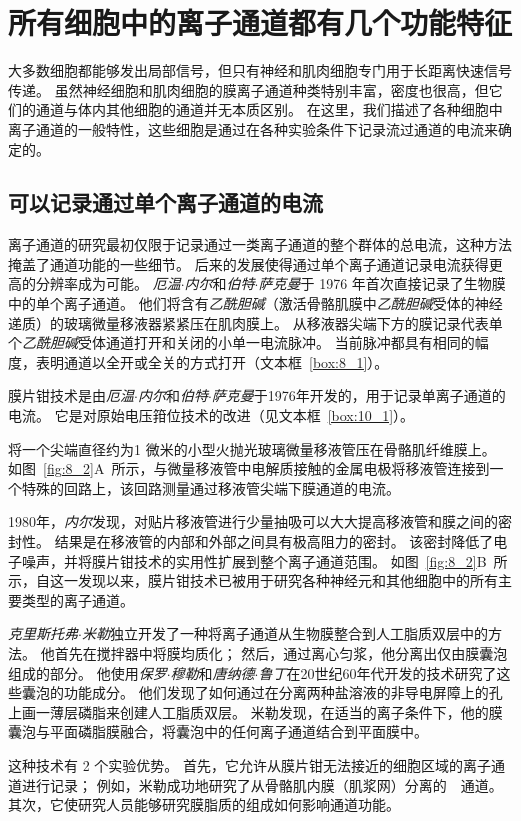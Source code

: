 \section{所有细胞中的离子通道都有几个功能特征}

大多数细胞都能够发出局部信号，但只有神经和肌肉细胞专门用于长距离快速信号传递。
虽然神经细胞和肌肉细胞的膜离子通道种类特别丰富，密度也很高，但它们的通道与体内其他细胞的通道并无本质区别。
在这里，我们描述了各种细胞中离子通道的一般特性，这些细胞是通过在各种实验条件下记录流过通道的电流来确定的。



\subsection{可以记录通过单个离子通道的电流}

离子通道的研究最初仅限于记录通过一类离子通道的整个群体的总电流，这种方法掩盖了通道功能的一些细节。
后来的发展使得通过单个离子通道记录电流获得更高的分辨率成为可能。
\textit{厄温$\cdot$内尔}和\textit{伯特$\cdot$萨克曼}于 1976 年首次直接记录了生物膜中的单个离子通道。
他们将含有\textit{乙酰胆碱}（激活骨骼肌膜中\textit{乙酰胆碱}受体的神经递质）的玻璃微量移液器紧紧压在肌肉膜上。
从移液器尖端下方的膜记录代表单个\textit{乙酰胆碱}受体通道打开和关闭的小单一电流脉冲。
当前脉冲都具有相同的幅度，表明通道以全开或全关的方式打开（文本框~\ref{box:8_1}）。


\begin{proposition} \label{box:8_1}
	
	\quad \quad 膜片钳技术是由\textit{厄温$\cdot$内尔}和\textit{伯特$\cdot$萨克曼}于1976年开发的，用于记录单离子通道的电流。
	它是对原始电压箝位技术的改进（见文本框~\ref{box:10_1}）。
	
	\quad \quad 将一个尖端直径约为1 微米的小型火抛光玻璃微量移液管压在骨骼肌纤维膜上。
	如图~\ref{fig:8_2}A~所示，与微量移液管中电解质接触的金属电极将移液管连接到一个特殊的回路上，该回路测量通过移液管尖端下膜通道的电流。
	
	\quad \quad 1980年，\textit{内尔}发现，对贴片移液管进行少量抽吸可以大大提高移液管和膜之间的密封性。
	结果是在移液管的内部和外部之间具有极高阻力的密封。
	该密封降低了电子噪声，并将膜片钳技术的实用性扩展到整个离子通道范围。
	如图~\ref{fig:8_2}B~所示，自这一发现以来，膜片钳技术已被用于研究各种神经元和其他细胞中的所有主要类型的离子通道。
	
	\quad \quad \textit{克里斯托弗$\cdot$米勒}独立开发了一种将离子通道从生物膜整合到人工脂质双层中的方法。
	他首先在搅拌器中将膜均质化；
	然后，通过离心匀浆，他分离出仅由膜囊泡组成的部分。
	他使用\textit{保罗$\cdot$穆勒}和\textit{唐纳德$\cdot$鲁丁}在20世纪60年代开发的技术研究了这些囊泡的功能成分。
	他们发现了如何通过在分离两种盐溶液的非导电屏障上的孔上画一薄层磷脂来创建人工脂质双层。
	米勒发现，在适当的离子条件下，他的膜囊泡与平面磷脂膜融合，将囊泡中的任何离子通道结合到平面膜中。
	
	\quad \quad 这种技术有 2 个实验优势。
	首先，它允许从膜片钳无法接近的细胞区域的离子通道进行记录；
	例如，米勒成功地研究了从骨骼肌内膜（肌浆网）分离的~~通道。
	其次，它使研究人员能够研究膜脂质的组成如何影响通道功能。
	
\end{proposition}



